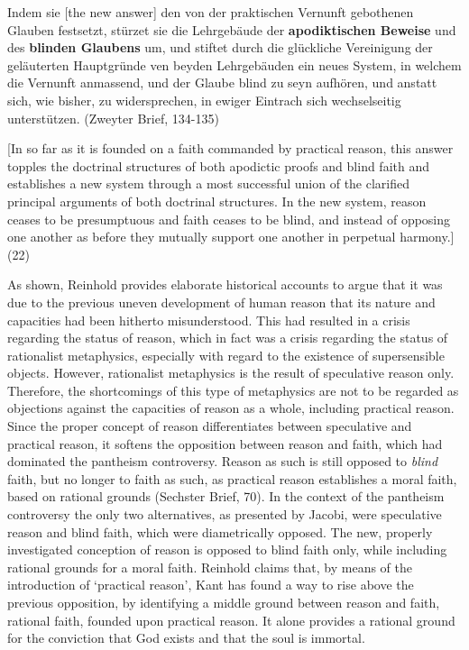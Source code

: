Indem sie [the new answer] den von der praktischen Vernunft gebothenen Glauben festsetzt, st\"{u}rzet sie die Lehrgeb\"{a}ude der \textbf{apodiktischen Beweise} und des \textbf{blinden Glaubens} um, und stiftet durch die gl\"{u}ckliche Vereinigung der gel\"{a}uterten Hauptgr\"{u}nde ven beyden Lehrgeb\"{a}uden ein neues System, in welchem die Vernunft anmassend, und der Glaube blind zu seyn aufh\"{o}ren, und anstatt sich, wie bisher, zu widersprechen, in ewiger Eintrach sich wechselseitig unterst\"{u}tzen. (Zweyter Brief, 134{-}135)

[In so far as it is founded on a faith commanded by practical reason, this answer topples the doctrinal structures of both apodictic proofs and blind faith and establishes a new system through a most successful union of the clarified principal arguments of both doctrinal structures. In the new system, reason ceases to be presumptuous and faith ceases to be blind, and instead of opposing one another as before they mutually support one another in perpetual harmony.] (22)

As shown, Reinhold provides elaborate historical accounts to argue that it was due to the previous uneven development of human reason that its nature and capacities had been hitherto misunderstood. This had resulted in a crisis regarding the status of reason, which in fact was a crisis regarding the status of rationalist metaphysics, especially with regard to the existence of supersensible objects. However, rationalist metaphysics is the result of speculative reason only. Therefore, the shortcomings of this type of metaphysics are not to be regarded as objections against the capacities of reason as a whole, including practical reason. Since the proper concept of reason differentiates between speculative and practical reason, it softens the opposition between reason and faith, which had dominated the pantheism controversy. Reason as such is still opposed to \textit{blind} faith, but no longer to faith as such, as practical reason establishes a moral faith, based on rational grounds (Sechster Brief, 70). In the context of the pantheism controversy the only two alternatives, as presented by Jacobi, were speculative reason and blind faith, which were diametrically opposed. The new, properly investigated conception of reason is opposed to blind faith only, while including rational grounds for a moral faith. Reinhold claims that, by means of the introduction of `practical reason', Kant has found a way to rise above the previous opposition, by identifying a middle ground between reason and faith, rational faith, founded upon practical reason. It alone provides a rational ground for the conviction that God exists and that the soul is immortal. 

